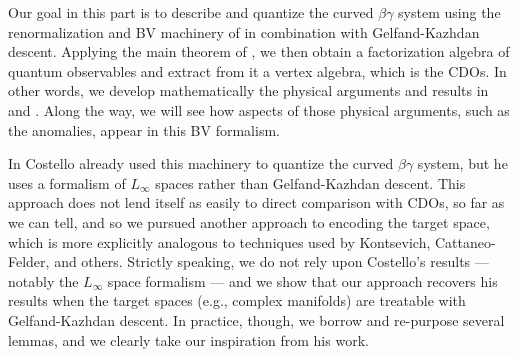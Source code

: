 Our goal in this part is to describe and quantize the curved $\beta\gamma$ system 
using the renormalization and BV machinery of \cite{CosBook} in combination with Gelfand-Kazhdan descent.
Applying the main theorem of \cite{CG2}, we then obtain a factorization algebra of quantum observables 
and extract from it a vertex algebra, which is the CDOs.
In other words, we develop mathematically the physical arguments and results in \cite{WittenCDO} and \cite{Nek}.
Along the way, we will see how aspects of those physical arguments, such as the anomalies,
appear in this BV formalism.

\begin{rmk}
In \cite{WG1,WG2} Costello already used this machinery to quantize the curved $\beta\gamma$ system,
but he uses a formalism of $L_\infty$ spaces rather than Gelfand-Kazhdan descent.
This approach does not lend itself as easily to direct comparison with CDOs, so far as we can tell,
and so we pursued another approach to encoding the target space, 
which is more explicitly analogous to techniques used by Kontsevich, Cattaneo-Felder, and others.
Strictly speaking, we do not rely upon Costello's results --- notably the $L_\infty$ space formalism --- and we show that our approach recovers his results when the target spaces (e.g., complex manifolds) 
are treatable with Gelfand-Kazhdan descent.
In practice, though, we borrow and re-purpose several lemmas, and 
we clearly take our inspiration from his work.
\end{rmk}

